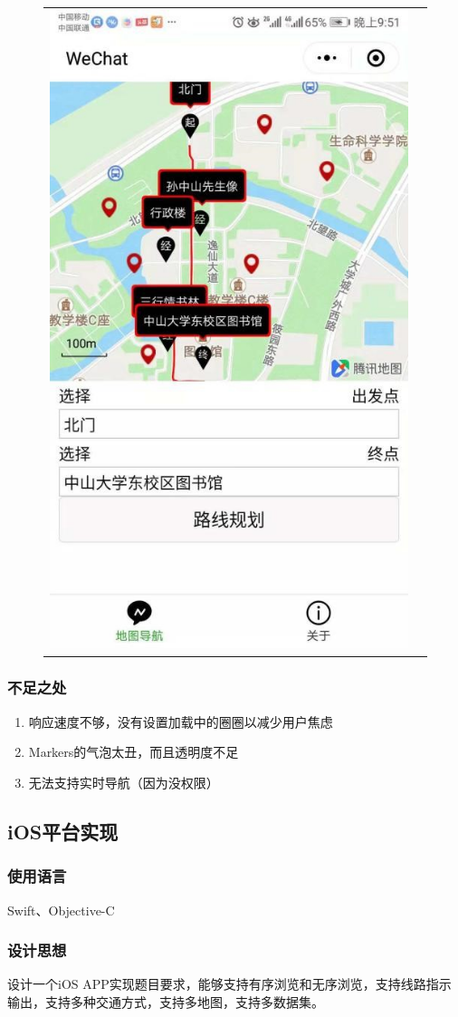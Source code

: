 \documentclass[12pt,UTF8]{ctexart}
\begin{document}
\begin{spacing}{1.4}
\begin{figure}[H]
\begin{tabular}{cc}
\includegraphics[width=0.3\linewidth]{fig/wechat4.jpg}
\end{tabular}
\end{figure}

\subsubsection{不足之处}
\begin{enumerate}
	\item 响应速度不够，没有设置加载中的圈圈以减少用户焦虑
	\item Markers的气泡太丑，而且透明度不足
	\item 无法支持实时导航（因为没权限）
\end{enumerate}


\subsection{iOS平台实现}
\subsubsection{使用语言}
Swift、Objective-C

\subsubsection{设计思想}
设计一个iOS APP实现题目要求，能够支持有序浏览和无序浏览，支持线路指示输出，支持多种交通方式，支持多地图，支持多数据集。


\end{spacing}
\end{document}

